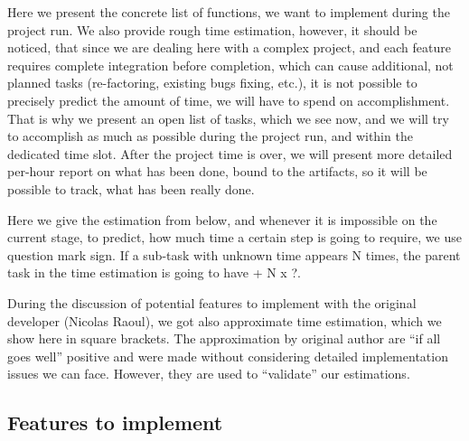 \documentclass[a4paper,11pt,twoside]{article}
\begin{document}
Here we present the concrete list of functions, we want to implement during the project run.
We also provide rough time estimation, however, it should be noticed, that since we are dealing
here with a complex project, and each feature requires complete integration before completion,
which can cause additional, not planned tasks (re-factoring, existing bugs fixing, etc.),
it is not possible to precisely predict the amount of time, we will have to spend on accomplishment.
That is why we present an open list of tasks, which we see now, and we will try to accomplish as much
as possible during the project run, and within the dedicated time slot. After the project time
is over, we will present more detailed per-hour report on what has been done, bound to the artifacts,
so it will be possible to track, what has been really done.

Here we give the estimation from below, and whenever it is impossible on the current stage,
to predict, how much time a certain step is going to require, we use question mark sign. 
If a sub-task with unknown time appears N times, the parent task in the time estimation
is going to have + N x ?. 

During the discussion of potential features to implement with the original developer (Nicolas Raoul),
we got also approximate time estimation, which we show here in square brackets. The approximation
by original author are ``if all goes well'' positive and were made without considering detailed
implementation issues we can face. However, they are used to ``validate'' our estimations.

\subsection{Features to implement}
\end{document}

